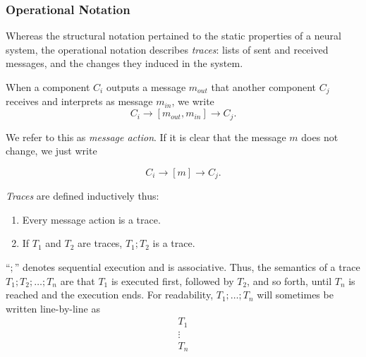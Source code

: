 \subsubsection{Operational Notation}

Whereas the structural notation pertained to the static properties of a neural system, the operational notation describes {\em traces}: lists of sent and received messages, and the changes they induced in the system.

\begin{definition}
	When a component $C_i$ outputs a message $m_{out}$ that another component $C_j$ receives and interprets as message $m_{in}$, we write
	$$
	C_i \rightarrow [m_{out}, m_{in}] \rightarrow C_j.
	$$
	
	We refer to this as {\em message action}. If it is clear that the message $m$ does not change, we just write
	
	$$
	C_i \rightarrow [m] \rightarrow C_j.
	$$
\end{definition}

\begin{definition}[Trace]
	\emph{Traces} are defined inductively thus:
	\begin{enumerate}
		\item Every message action is a trace.
		\item If $T_1$ and $T_2$ are traces, $T_1;T_2$ is a trace.
	\end{enumerate}
	
	``$;$'' denotes sequential execution and is associative. Thus, the semantics of a trace $T_1;T_2;\dots;T_n$ are that $T_1$ is executed first, followed by $T_2$, and so forth, until $T_n$ is reached and the execution ends.
	For readability, $T_1;\dots;T_n$ will sometimes be written line-by-line as
	$$
	\begin{array}{l}
	T_1\\
	\vdots\\
	T_n
	\end{array}
	$$
\end{definition}

